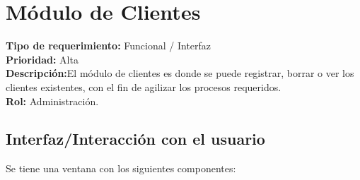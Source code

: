 \documentclass[a4paper,DIV=12]{scrreprt}
\begin{document}

\newpage
\setcounter{chapter}{5}
\setcounter{section}{-1}
\setcounter{subsection}{-1}
\section{Módulo de Clientes}
\noindent
\textbf{Tipo de requerimiento:} Funcional / Interfaz\\
\textbf{Prioridad:} Alta\\
\textbf{Descripción:}El módulo de clientes es donde se puede registrar, borrar o ver los clientes existentes, con el fin de agilizar los procesos requeridos. \\
\textbf{Rol:} Administración.

\subsection*{Interfaz/Interacción con el usuario}
Se tiene una ventana con los siguientes componentes: \\
\end{document}
